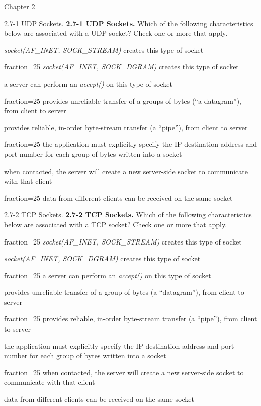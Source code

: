 \documentclass[a4paper]{article}
\begin{document}
\begin{quiz}{Chapter 2}
\begin{multi}[points=1,shuffle,multiple]{2.7-1 UDP Sockets.}
\textbf{2.7-1 UDP Sockets.} 
Which of the following characteristics below are associated with a UDP socket? Check one or more that apply. 
\item \emph{socket(AF\_INET, SOCK\_STREAM)} creates this type of socket
\item[fraction=25] \emph{socket(AF\_INET, SOCK\_DGRAM)} creates this type of socket
\item a server can perform an \emph{accept()} on this type of socket
\item[fraction=25] provides unreliable transfer of a groups of bytes (``a datagram''), from client to server
\item provides reliable, in-order byte-stream transfer (a ``pipe''), from client to server
\item[fraction=25] the application must explicitly specify the IP destination address and port number for each group of bytes written into a socket
\item when contacted, the server will create a new server-side socket to communicate with that client
\item[fraction=25] data from different clients can be received on the same socket
\end{multi}

\begin{multi}[points=1,shuffle,multiple]{2.7-2 TCP Sockets.}
\textbf{2.7-2 TCP Sockets.} 
Which of the following characteristics below are associated with a TCP socket? Check one or more that apply. 
\item[fraction=25] \emph{socket(AF\_INET, SOCK\_STREAM)} creates this type of socket
\item \emph{socket(AF\_INET, SOCK\_DGRAM)} creates this type of socket
\item[fraction=25] a server can perform an \emph{accept()} on this type of socket
\item provides unreliable transfer of a group of bytes (a ``datagram''), from client to server
\item[fraction=25] provides reliable, in-order byte-stream transfer (a ``pipe''), from client to server
\item the application must explicitly specify the IP destination address and port number for each group of bytes written into a socket
\item[fraction=25] when contacted, the server will create a new server-side socket to communicate with that client
\item data from different clients can be received on the same socket
\end{multi}


\end{quiz}
\end{document}
